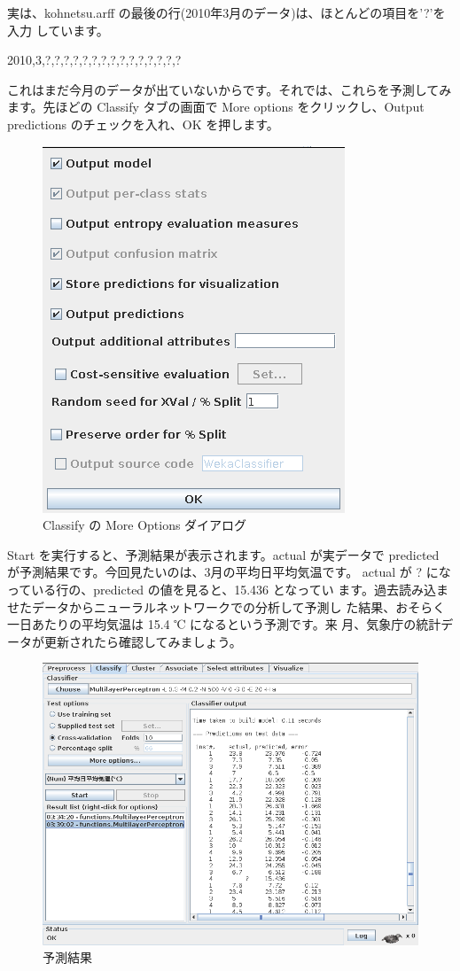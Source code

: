 \documentclass[mingoth,a4paper]{jsarticle}
\begin{document}
実は、kohnetsu.arff の最後の行(2010年3月のデータ)は、ほとんどの項目を'?'を入力
しています。

\begin{commandline}
2010,3,?,?,?,?,?,?,?,?,?,?,?,?,?,?,?
\end{commandline}

これはまだ今月のデータが出ていないからです。それでは、これらを予測してみ
ます。先ほどの Classify タブの画面で More options をクリックし、Output
predictions のチェックを入れ、OK を押します。

\begin{figure}[H]
\begin{center}
\includegraphics[width=0.4\hsize]{image201003/weka8.png}
\caption{Classify の More Options ダイアログ}
\end{center}
\end{figure}

Start を実行すると、予測結果が表示されます。actual が実データで
predicted が予測結果です。今回見たいのは、3月の平均日平均気温です。
actual が ? になっている行の、predicted の値を見ると、15.436 となってい
ます。過去読み込ませたデータからニューラルネットワークでの分析して予測し
た結果、おそらく一日あたりの平均気温は 15.4 ℃ になるという予測です。来
月、気象庁の統計データが更新されたら確認してみましょう。

\begin{figure}[H]
\begin{center}
\includegraphics[width=0.6\hsize]{image201003/weka9.png}
\caption{予測結果}
\end{center}
\end{figure}
\end{document}
